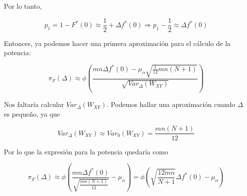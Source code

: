 Por lo tanto,

$$
p_1=1-F^*(0)\approx\frac{1}{2}+\Delta f^*(0) \Longrightarrow p_1-\frac{1}{2}\approx \Delta f^*(0)
$$

Entonces, ya podemos hacer una primera aproximación para el cálculo de la potencia:

$$
\pi_F(\Delta)\approx \phi\left(\frac{mn\Delta f^*(0)-\mu_\alpha\sqrt{\frac{1}{12}mn(N+1)}}{\sqrt{Var_\Delta(W_{XY})}}\right)
$$

Nos faltaría calcular $Var_\Delta(W_{XY})$. Podemos hallar una aproximación cuando $\Delta$ es pequeño, ya que 

$$
Var_\Delta(W_{XY})\approx Var_0(W_{XY})=\frac{mn(N+1)}{12}
$$

Por lo que la expresión para la potencia quedaría como

$$
\pi_F(\Delta)\approx\phi\left(\frac{mn\Delta f^*(0)}{\sqrt{\frac{mn(N+1)}{12}}}-\mu_\alpha\right)=\phi\left(\sqrt{\frac{12mn}{N+1}}\Delta f^*(0)-\mu_\alpha\right)
$$